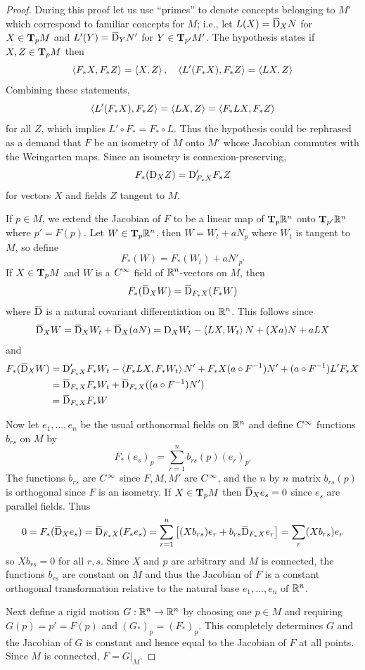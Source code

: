 \documentclass[../main]{subfiles}
\begin{document}
\begin{proof}
During this proof let us use ``primes'' to denote concepts belonging to $M'$ which correspond to familiar concepts for $M$; i.e., let $L(X)=\covariant_XN$ for $X\in\ts Mp$ and $L'(Y)=\covariant_YN'$ for $Y\in\ts{M'}{p'}$. The hypothesis states if $X,Z\in\ts Mp$ then
\[\ip{F_\ast X}{F_\ast Z} = \ip XZ,
\quad \ip{L'(F_\ast X)}{F_\ast Z} = \ip{LX}{Z}\]
Combining these statements,
\[\ip{L'(F_\ast X)}{F_\ast Z} = \ip{LX}{Z} = \ip{F_\ast LX}{F_\ast Z}\]
for all $Z$, which implies $L'\circ F_\ast =F_\ast \circ L$. Thus the hypothesis could be rephrased as a demand that $F$ be an isometry of $M$ onto $M'$ whose Jacobian commutes with the Weingarten maps. Since an isometry is connexion-preserving, \[F_\ast (\D_XZ)=\D'_{F_\ast X}F_\ast Z\]
for vectors $X$ and fields $Z$ tangent to $M$.

If $p\in M$, we extend the Jacobian of $F$ to be a linear map of $\ts{\bR^n}{p}$ onto $\ts{\bR^n}{p'}$ where $p'=F(p)$. Let $W\in\ts{\bR^n}{p}$, then $W=W_t+aN_p$ where $W_t$ is tangent to $M$, so define
\[F_\ast (W) = F_\ast (W_t) + aN'_{p'}\]
If $X\in\ts Mp$ and $W$ is a $\CInfty$ field of $\bR^n$-vectors on $M$, then
\[F_\ast (\covariant_XW) = \covariant_{F_\ast X}(F_\ast W)\]
where $\covariant$ is a natural covariant differentiation on $\bR^n$. This follows since
\[\covariant_XW = \covariant_XW_t+\covariant_X(aN) = \D_XW_t - \ip{LX}{W_t}N + (Xa)N + aLX\]
and
\begin{align*}
    F_\ast (\covariant_XW) &= \D'_{F_\ast X}F_\ast W_t - \ip{F_\ast LX}{F_\ast W_t}N' + F_\ast X(a\circ F\inv)N' + (a\circ F\inv)L'F_\ast X \\
    &= \covariant_{F_\ast X}F_\ast W_t + \covariant_{F_\ast X}((a\circ F\inv)N') \\
    &= \covariant_{F_\ast X}F_\ast W
\end{align*}

Now let $e_1,\ldots,e_n$ be the usual orthonormal fields on $\bR^n$ and define $\CInfty$ functions $b_{rs}$ on $M$ by
\[F_\ast (e_s)_p = \sum_{r=1}^n b_{rs}(p)(e_r)_{p'}\]
The functions $b_{rs}$ are $\CInfty$ since $F,M,M'$ are $\CInfty$, and the $n$ by $n$ matrix $b_{rs}(p)$ is orthogonal since $F$ is an isometry. If $X\in\ts Mp$ then $\covariant_Xe_s=0$ since $e_s$ are parallel fields. Thus
\[0 = F_\ast (\covariant_Xe_s) = \covariant_{F_\ast X}(F_\ast e_s) = \sum_{r=1}^n\sbr{(Xb_{rs})e_r+b_{rs}\covariant_{F_\ast X}e_r} = \sum_r(Xb_{rs})e_r\]
so $Xb_{rs}=0$ for all $r,s$. Since $X$ and $p$ are arbitrary and $M$ is connected, the functions $b_{rs}$ are constant on $M$ and thus the Jacobian of $F$ is a constant orthogonal transformation relative to the natural base $e_1,\ldots,e_n$ of $\bR^n$.

Next define a rigid motion $G:\bR^n\functionMaps\bR^n$ by choosing one $p\in M$ and requiring $G(p)=p'=F(p)$ and $(G_\ast)_p=(F_\ast)_p$. This completely determines $G$ and the Jacobian of $G$ is constant and hence equal to the Jacobian of $F$ at all points. Since $M$ is connected, $F=G|_M$.
\end{proof}
\end{document}
